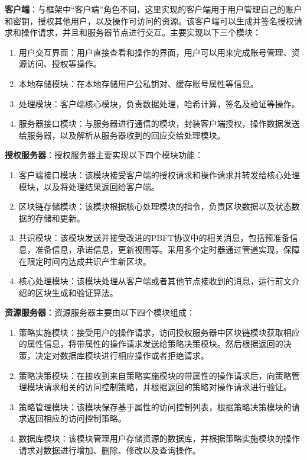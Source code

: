 \begin{description}
  \item \textbf{客户端}：与框架中“客户端”角色不同，这里实现的客户端用于用户管理自己的账户和密钥，授权其他用户，以及操作可访问的资源。该客户端可以生成并签名授权请求和操作请求，并且和服务器节点进行交互。主要实现以下三个模块：
    \begin{enumerate}
      \item 用户交互界面：用户直接查看和操作的界面，用户可以用来完成账号管理、资源访问、授权等操作。
      \item 本地存储模块：在本地存储用户公私钥对、缓存账号属性等信息。
      \item 处理模块：客户端核心模块，负责数据处理，哈希计算，签名及验证等操作。
      \item 服务器接口模块：与服务器进行通信的模块，封装客户端授权，操作数据发送给服务器，以及解析从服务器收到的回应交给处理模块。
    \end{enumerate}
  \item \textbf{授权服务器}：授权服务器主要实现以下四个模块功能：
    \begin{enumerate}
      \item 客户端接口模块：该模块接受客户端的授权请求和操作请求并转发给核心处理模块，以及将处理结果返回给客户端。
      \item 区块链存储模块：该模块根据核心处理模块的指令，负责区块数据以及状态数据的存储和更新。
      \item 共识模块：该模块发送并接受改进的PBFT协议中的相关消息，包括预准备信息，准备信息，承诺信息，更新视图等。采用多个定时器通过管道实现，保障在限定时间内达成共识产生新区块。
      \item 核心处理模块：该模块处理从客户端或者其他节点接收到的消息，运行前文介绍的区块生成和验证算法。
    \end{enumerate}
  \item \textbf{资源服务器}：资源服务器主要由以下四个模块组成：
    \begin{enumerate}
      \item 策略实施模块：接受用户的操作请求，访问授权服务器中区块链模块获取相应的属性信息，将带属性的操作请求发送给策略决策模块。然后根据返回的决策，决定对数据库模块进行相应操作或者拒绝请求。
      \item 策略决策模块：在接收到来自策略实施模块的带属性的操作请求后，向策略管理模块请求相关的访问控制策略，并根据返回的策略对操作请求进行验证。
      \item 策略管理模块：该模块保存基于属性的访问控制列表，根据策略决策模块的请求返回相应的访问控制策略。
      \item 数据库模块：该模块管理用户存储资源的数据库，并根据策略实施模块的操作请求对数据进行增加、删除、修改以及查询操作。
    \end{enumerate}
\end{description}

